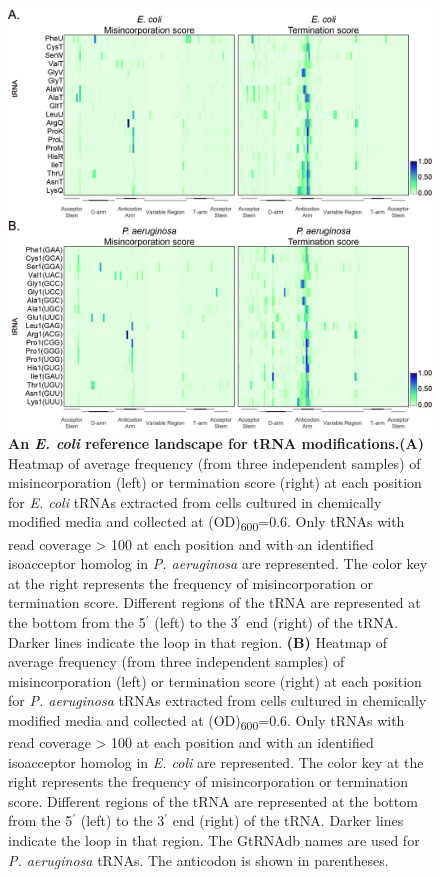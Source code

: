 \documentclass[times, twoside]{zHenriquesLab-StyleBioRxiv}
\begin{document}
\begin{figure}[h]
\centering
\includegraphics[width=1\linewidth]{Figure1.jpg}
\caption{\textbf{\textbf{An }\textit{\textbf{E. coli}}\textbf{ reference landscape for tRNA modifications.}(A)} Heatmap of average frequency (from three independent samples) of misincorporation (left) or termination score (right) at each position for \textit{E. coli} tRNAs extracted from cells cultured in chemically modified media and collected at (OD)\textsubscript{600}=0.6. Only tRNAs with read coverage > 100 at each position and with an identified isoacceptor homolog in \textit{P. aeruginosa} are represented. The color key at the right represents the frequency of misincorporation or termination score. Different regions of the tRNA are represented at the bottom from the 5\(^{\prime}\)  (left) to the 3\(^{\prime}\)  end (right) of the tRNA. Darker lines indicate the loop in that region.\textbf{ (B)} Heatmap of average frequency (from three independent samples) of misincorporation (left) or termination score (right) at each position for \textit{P. aeruginosa} tRNAs extracted from cells cultured in chemically modified media and collected at (OD)\textsubscript{600}=0.6. Only tRNAs with read coverage > 100 at each position and with an identified isoacceptor homolog in \textit{E. coli} are represented. The color key at the right represents the frequency of misincorporation or termination score. Different regions of the tRNA are represented at the bottom from the 5\(^{\prime}\) (left) to the 3\(^{\prime}\) end (right) of the tRNA. Darker lines indicate the loop in that region. The GtRNAdb names are used for \textit{P. aeruginosa} tRNAs. The anticodon is shown in parentheses.}
\end{figure}
\end{document}
